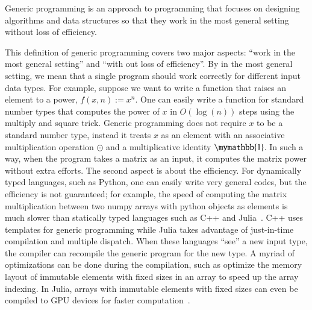 \documentclass[onefignum, onetabnum]{siamart190516}
\newcommand{\<}{\langle}
\renewcommand{\>}{\rangle}
\newcommand{\blue}[1]{[{\bf  \color{blue}{JG: #1}}]}
\newcommand{\purple}[1]{[{\bf  \color{purple}{MC: #1}}]}
\newcommand{\xpurple}[1]{[{\bf  \color{purple}{\sout{MC: #1}}}]}
\newcounter{example}
\begin{document}
\begin{definition}
   Generic programming is an approach to programming that focuses on designing algorithms and data structures so that they work in the most general setting without loss of efficiency.
\end{definition}
This definition of generic programming covers two major aspects: ``work in the most general setting'' and ``with out loss of efficiency''.
By in the most general setting, we mean that a single program should work correctly for different input data types. For example, 
suppose we want to write a function that raises an element to a power, $f(x, n) := x^n$.
One can easily write a function for standard number types that computes the power of $x$ in $O \left( \log(n) \right)$ steps using the multiply and square trick.
Generic programming does not require $x$ to be a standard number type,
instead it treats $x$ as an element with an associative multiplication operation $\odot$ and a multiplicative identity $\mymathbb{1}$.
In such a way, when the program takes a matrix as an input, it computes the matrix power without extra efforts.
The second aspect is about the efficiency. For dynamically typed languages, such as Python,
one can easily write very general codes, but the efficiency is not guaranteed; for example, the speed of computing the matrix multiplication between two numpy arrays with python objects as elements is much slower than statically typed languages such as C++ and Julia~\cite{Bezanson2012}.
C++ uses templates for generic programming while Julia takes advantage of just-in-time compilation and multiple dispatch.
When these languages ``see'' a new input type, the compiler can recompile the generic program for the new type.
A myriad of optimizations can be done during the compilation, such as optimize the memory layout of immutable elements with fixed sizes in an array to speed up the array indexing.
In Julia, arrays with immutable elements with fixed sizes can even be compiled to GPU devices for faster computation~\cite{Besard2018}.
\end{document}
